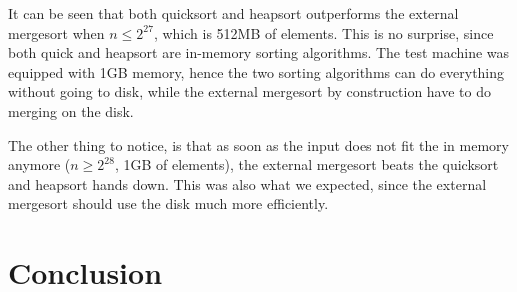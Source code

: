 \documentclass[a4paper,12pt]{article}
\begin{document}
It can be seen that both quicksort and heapsort outperforms the
external mergesort when $n \leq 2^{27}$, which is 512MB of
elements. This is no surprise, since both quick and heapsort are
in-memory sorting algorithms. The test machine was equipped with 1GB memory, hence
the two sorting algorithms can do everything without going to disk,
while the external mergesort by construction have to do merging on
the disk.

The other thing to notice, is that as soon as the input does not fit
the in memory anymore ($n \geq 2^{28}$, 1GB of elements), the external
mergesort beats the quicksort and heapsort hands down. This was also
what we expected, since the external mergesort should use the disk
much more efficiently.

\section{Conclusion}


\clearpage{}
\end{document}

